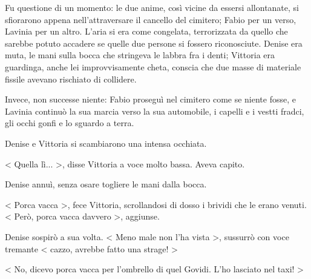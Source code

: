 Fu questione di un momento: le due anime, così vicine da essersi allontanate, si sfiorarono appena nell'attraversare il cancello del cimitero; Fabio per un verso, Lavinia per un altro. L'aria si era come congelata, terrorizzata da quello che sarebbe potuto accadere se quelle due persone si fossero riconosciute. Denise era muta, le mani sulla bocca che stringeva le labbra fra i denti; Vittoria era guardinga, anche lei improvvisamente cheta, conscia che due masse di materiale fissile avevano rischiato di collidere.

Invece, non successe niente: Fabio proseguì nel cimitero come se niente fosse, e Lavinia continuò la sua marcia verso la sua automobile, i capelli e i vestti fradci, gli occhi gonfi e lo sguardo a terra.

Denise e Vittoria si scambiarono una intensa occhiata.

< Quella lì... >, disse Vittoria a voce molto bassa. Aveva capito.

Denise annuì, senza osare togliere le mani dalla bocca.

< Porca vacca >, fece Vittoria, scrollandosi di dosso i brividi che le erano venuti. < Però, porca vacca davvero >, aggiunse.

Denise sospirò a sua volta. < Meno male non l'ha vista >, sussurrò con voce tremante < cazzo, avrebbe fatto una strage! >

< No, dicevo porca vacca per l'ombrello di quel Govidi. L'ho lasciato nel taxi! >

